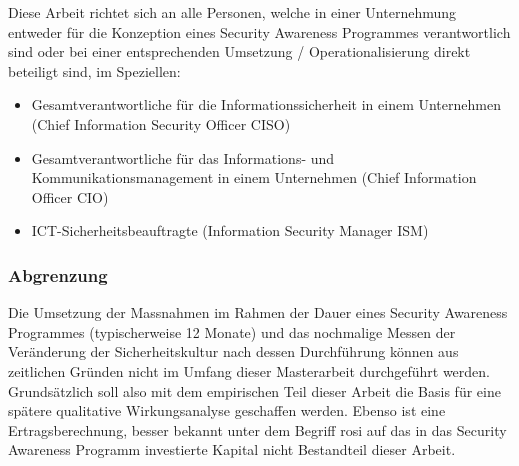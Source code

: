 \documentclass[../../main.tex]{subfiles}
\begin{document}
\begin{sloppypar}
Diese Arbeit richtet sich an alle Personen, welche in einer Unternehmung entweder für die Konzeption eines Security Awareness Programmes verantwortlich sind oder bei einer entsprechenden Umsetzung / Operationalisierung direkt beteiligt sind, im Speziellen:
\begin{itemize}
  \item Gesamtverantwortliche für die Informationssicherheit in einem Unternehmen \newline (Chief Information Security Officer CISO)
  \item Gesamtverantwortliche für das Informations- und Kommunikationsmanagement \newline in einem Unternehmen (Chief Information Officer CIO)
  \item ICT-Sicherheitsbeauftragte (Information Security Manager ISM)
\end{itemize}

\end{sloppypar}

\subsubsection*{Abgrenzung}

\begin{sloppypar}
Die Umsetzung der Massnahmen im Rahmen der Dauer eines Security Awareness Programmes (typischerweise 12 Monate) und das nochmalige Messen der Veränderung der Sicherheitskultur nach dessen Durchführung können aus zeitlichen Gründen nicht im Umfang dieser Masterarbeit durchgeführt werden. Grundsätzlich soll also mit dem empirischen Teil dieser Arbeit die Basis für eine spätere qualitative Wirkungsanalyse geschaffen werden. Ebenso ist eine Ertragsberechnung, besser bekannt unter dem Begriff \acrfull{rosi} auf das in das Security Awareness Programm investierte Kapital nicht Bestandteil dieser Arbeit. 
\end{sloppypar}
\end{document}
